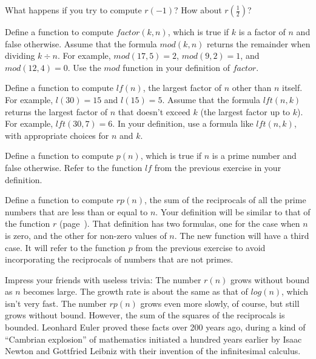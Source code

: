 \begin{ExerciseList}
\Exercise What happens if you try to compute $r(-1)$?  How
        about $r(\frac{1}{2})$?

\Exercise Define a function to compute $factor(k, n)$, which is true
        if $k$ is a factor of $n$ and false otherwise.
        Assume that the formula $mod(k,n)$ returns the remainder
        when dividing $k \div n$.
        For example, $mod(17,5)=2$, $mod(9,2)=1$, and $mod(12,4)=0$.
        Use the $mod$ function in your definition of $factor$.

\Exercise Define a function to compute $lf(n)$,
        the largest factor of $n$ other than $n$ itself.
        For example, $l(30)=15$ and
        $l(15)=5$.
        Assume that the formula
        $lft(n,k)$  returns the largest factor of
        $n$ that doesn't exceed $k$ (the largest factor up to $k$).
        For example, $lft(30,7)=6$.
        In your definition, use a formula like $lft(n,k)$,
        with appropriate choices for $n$ and $k$.

\Exercise Define a function to compute $p(n)$, which is true
        if $n$ is a prime number and false otherwise.
        Refer to the function $lf$
        from the previous exercise in your definition.

\Exercise Define a function to compute $rp(n)$,
        the sum of the reciprocals of all the prime numbers that are less than or equal to $n$.
        Your definition will be similar to that of the function $r$ (page~\pageref{reciprocalsdef}).
        That definition has two formulas, one for the case when $n$ is zero,
        and the other for non-zero values of $n$.
        The new function will have a third case.
        It will refer to the function $p$ from the previous exercise
        to avoid incorporating the reciprocals of numbers that are not primes.
\end{ExerciseList}

        Impress your friends with useless trivia:
        The number $r(n)$ grows without bound as $n$ becomes large.
        The growth rate is about the same as that of $log(n)$, which isn't very fast.
        The number $rp(n)$ grows even more slowly, of course,
        but still grows without bound.
        However, the sum of the squares of the reciprocals is bounded.
        Leonhard Euler proved these facts over 200 years ago, during
        a kind of ``Cambrian explosion'' of mathematics initiated a hundred years earlier
        by Isaac Newton and Gottfried Leibniz with their invention of the infinitesimal calculus.

